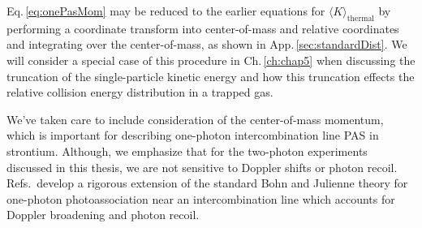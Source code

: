 Eq.\,\ref{eq:onePasMom} may be reduced to the earlier equations for $\langle K \rangle_\text{thermal}$ by performing a coordinate transform into center-of-mass and relative coordinates and integrating over the center-of-mass, as shown in App.\,\ref{sec:standardDist}.
We will consider a special case of this procedure in Ch.\,\ref{ch:chap5} when discussing the truncation of the single-particle kinetic energy and how this truncation effects the relative collision energy distribution in a trapped gas.

We've taken care to include consideration of the center-of-mass momentum, which is important for describing one-photon intercombination line PAS in strontium.
Although, we emphasize that for the two-photon experiments discussed in this thesis, we are not sensitive to Doppler shifts or photon recoil.
Refs.\,\cite{Ciuryo2004, Borkowski2014a} develop a rigorous extension of the standard Bohn and Julienne theory for one-photon photoassociation near an intercombination line which accounts for Doppler broadening and photon recoil.



%
%
%
%
%


